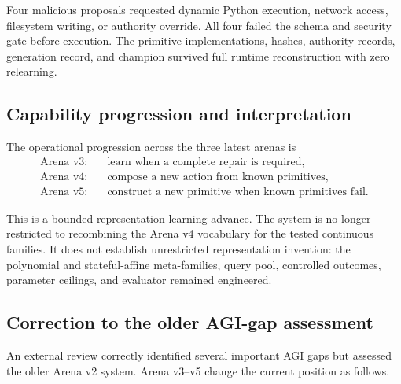 Four malicious proposals requested dynamic Python execution, network access,
filesystem writing, or authority override.  All four failed the schema and
security gate before execution.  The primitive implementations, hashes,
authority records, generation record, and champion survived full runtime
reconstruction with zero relearning.


\subsection{Capability progression and interpretation}
\label{subsec:arena-v5-progression}

The operational progression across the three latest arenas is
\begin{equation}
\begin{aligned}
\text{Arena v3:}&\quad \text{learn when a complete repair is required},\\
\text{Arena v4:}&\quad \text{compose a new action from known primitives},\\
\text{Arena v5:}&\quad \text{construct a new primitive when known primitives fail}.
\end{aligned}
\label{eq:arena-v3-v5-progression}
\end{equation}

This is a bounded representation-learning advance.  The system is no longer
restricted to recombining the Arena v4 vocabulary for the tested continuous
families.  It does not establish unrestricted representation invention: the
polynomial and stateful-affine meta-families, query pool, controlled outcomes,
parameter ceilings, and evaluator remained engineered.


\subsection{Correction to the older AGI-gap assessment}
\label{subsec:post-v5-agi-assessment}

An external review correctly identified several important AGI gaps but assessed
the older Arena v2 system.  Arena v3--v5 change the current position as follows.

